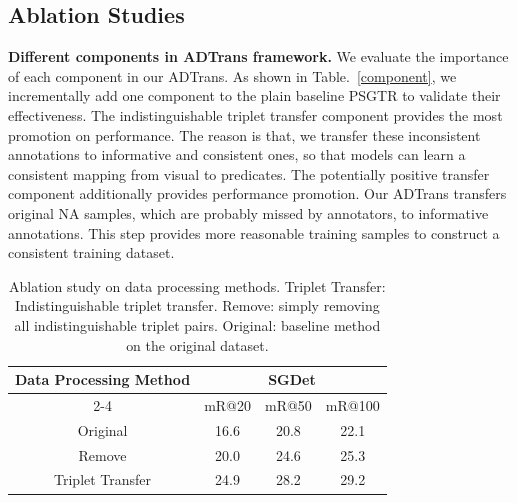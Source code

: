 \documentclass[letterpaper]{article} %
\begin{document}
\subsection{Ablation Studies}


\noindent\textbf{Different components in ADTrans framework.} We evaluate the importance of each component in our ADTrans. As shown in Table.~\ref{component}, we incrementally add one component to the plain baseline PSGTR \cite{yang2022psg} to validate their effectiveness.
The indistinguishable triplet transfer component provides the most promotion on performance. The reason is that, we transfer these inconsistent annotations to informative and consistent ones, so that models can learn a consistent mapping from visual to predicates.
The potentially positive transfer component additionally provides performance promotion. Our ADTrans transfers original NA samples, which are probably missed by annotators, to informative annotations. This step provides more reasonable training samples to construct a consistent training dataset.






\begin{table}[]

\tabcolsep=0.15cm


\begin{tabular}{c|ccc}
\hline
\multirow{2}{*}{Data Processing Method} & \multicolumn{3}{c}{SGDet}               \\ \cline{2-4}
                                 & mR@20     & mR@50     & mR@100    \\ \hline
Original                         & 16.6 & 20.8 & 22.1 \\ \hline

Remove                           & 20.0 & 24.6 & 25.3 \\ \hline

Triplet Transfer                 & 24.9 & 28.2 & 29.2 \\ \hline
\end{tabular}
\caption{Ablation study on data processing methods. Triplet Transfer: Indistinguishable triplet transfer. Remove: simply removing all indistinguishable triplet pairs. Original: baseline method on the original dataset.}
\label{TAB:remove}
\end{table}
\end{document}
